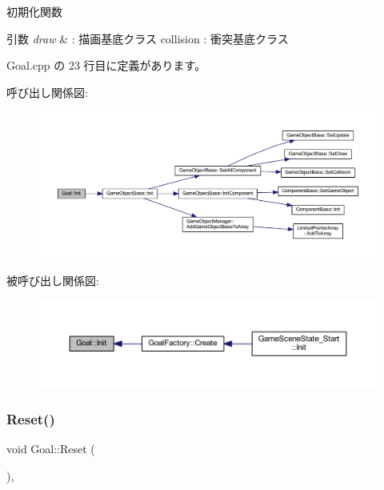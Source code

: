 初期化関数 


\begin{DoxyParams}{引数}
{\em draw} & \+: 描画基底クラス collision \+: 衝突基底クラス \\
\hline
\end{DoxyParams}


 Goal.\+cpp の 23 行目に定義があります。

呼び出し関係図\+:\nopagebreak
\begin{figure}[H]
\begin{center}
\leavevmode
\includegraphics[width=350pt]{class_goal_a694beb5a9164e2bea59fc43affbaa060_cgraph}
\end{center}
\end{figure}
被呼び出し関係図\+:\nopagebreak
\begin{figure}[H]
\begin{center}
\leavevmode
\includegraphics[width=350pt]{class_goal_a694beb5a9164e2bea59fc43affbaa060_icgraph}
\end{center}
\end{figure}
\mbox{\label{class_goal_a98b797c8012ab43d6fc8c42e4e91466b}} 
\subsubsection{\texorpdfstring{Reset()}{Reset()}}
{\footnotesize\ttfamily void Goal\+::\+Reset (\begin{DoxyParamCaption}{ }\end{DoxyParamCaption})\hspace{0.3cm}{\ttfamily [override]}, {\ttfamily [virtual]}}



